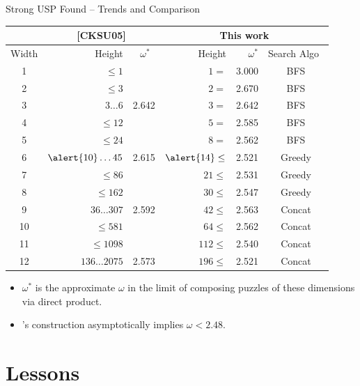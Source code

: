 \documentclass[t,10pt,
mathserif,xcolor=dvipsnames]{beamer}
\begin{document}
\begin{myframe}{Strong USP Found -- Trends and Comparison}

  \begin{center}
  \begin{tabular}{|c|r|r|r|r|c|}
    \hline
    & \multicolumn{2}{|c|}{[CKSU05]} & \multicolumn{3}{|c|}{This work} \\
    \hline
    Width & Height & $\omega^*$~ & Height & $\omega^*$ & Search Algo~\\
    \hline
    1 & $\le 1$ & & $1=$ & 3.000 & BFS \\
    2 & $\le 3$ & & $2=$ & 2.670 & BFS\\
    3 & $3 \ldots 6$ & 2.642 & $3=$ & 2.642 & BFS\\
    4 & $\le 12$ & & $5=$ & 2.585 & BFS\\
    5 & $\le 24$ & & $8=$ & 2.562 & BFS \\
    6 & $\alert{10} \ldots 45$ & \alert{2.615} &$\alert{14}\le$ & \alert{2.521} & Greedy\\
    7 & $\le 86$ & & $21\le$ & 2.531 & Greedy\\
    8 & $\le 162$ & & $30\le$ & 2.547 & Greedy\\
    9 & $36 \ldots 307$ & 2.592 &$42\le$ & 2.563 & Concat \\
    10 & $\le 581$ & & $64\le$ & 2.562 & Concat \\
    11 & $\le 1098$ & & $112\le$ & 2.540 & Concat\\
    12 & $136 \ldots 2075$ & 2.573 &$196\le$ & 2.521 & Concat \\
    \hline
  \end{tabular}
  \end{center}
  
  \begin{itemize}
  \item $\omega^*$ is the approximate $\omega$ in the limit of
    composing puzzles of these dimensions via direct product.
  \item \;[CKSU05]'s construction asymptotically implies $\omega <
    2.48$.
  \end{itemize}
  
\end{myframe}

\section{Lessons}

\end{document}
